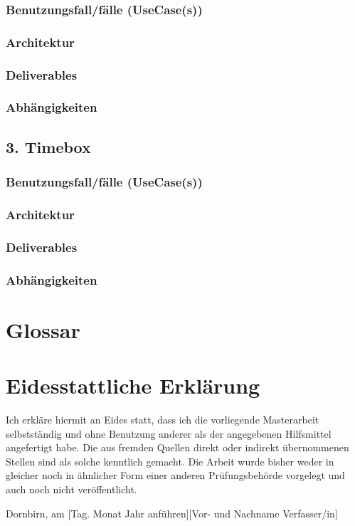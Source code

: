 \documentclass[a4paper,12pt,twoside]{scrreprt}
\begin{document}
    \subsection{Benutzungsfall/fälle (UseCase(s))  }
    \subsection{Architektur}
    \subsection{Deliverables}
    \subsection{Abhängigkeiten}

    \section{3. Timebox}
    \subsection{Benutzungsfall/fälle (UseCase(s))  }
    \subsection{Architektur}
    \subsection{Deliverables}
    \subsection{Abhängigkeiten}

    \chapter{Glossar}


    \chapter*{Eidesstattliche Erklärung}
    Ich erkläre hiermit an Eides statt, dass ich die vorliegende Masterarbeit selbstständig und ohne Benutzung anderer als der angegebenen Hilfsmittel angefertigt habe. Die aus fremden Quellen direkt oder indirekt übernommenen Stellen sind als solche kenntlich gemacht. Die Arbeit wurde bisher weder in gleicher noch in ähnlicher Form einer anderen Prüfungsbehörde vorgelegt und auch noch nicht veröffentlicht.

    \vspace{3cm}
    \noindent
    Dornbirn, am [Tag. Monat Jahr anführen]\hfill [Vor- und Nachname Verfasser/in]
\end{document}
